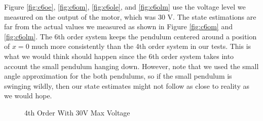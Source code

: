 \documentclass{article}
\begin{document}
Figure \ref{fig:c6oe}, \ref{fig:c6om}, \ref{fig:c6ole}, and \ref{fig:c6olm} use the voltage level we measured on the output of the motor, which was 30 V. The state estimations are far from the actual values we measured as shown in Figure \ref{fig:c6om} and \ref{fig:c6olm}. The 6th order system keeps the pendulum centered around a position of $x=0$ much more consistently than the 4th order system in our tests. This is what we would think should happen since the 6th order system takes into account the small pendulum hanging down. However, note that we used the small angle approximation for the both pendulums, so if the small pendulum is swinging wildly, then our state estimates might not follow as close to reality as we would hope.

\begin{figure}
\centering
{}
\caption{4th Order With 30V Max Voltage}
\end{figure}
\end{document}
